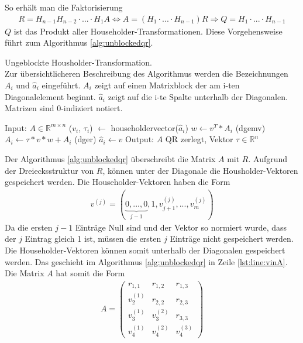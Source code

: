 So erhält man die Faktorisierung
\begin{align*}
R = H_{n-1} H_{n-2}\cdot ...\cdot H_1 A \Leftrightarrow A = (H_1\cdot ...\cdot H_{n-1})R \Rightarrow Q = H_1\cdot ... \cdot H_{n-1}
\end{align*}
$Q$ ist das Produkt aller Householder-Transformationen.
Diese Vorgehensweise führt zum Algorithmus \ref{alg:unblockedqr}. 
\begin{algorithm}[H]
	\caption{Ungeblockte Housholder-Transformation. \\
		Zur übersichtlicheren Beschreibung des Algorithmus werden die Bezeichnungen $A_i$ und $\hat{a}_i$ eingeführt.	$A_i$ zeigt auf einen Matrixblock der am i-ten Diagonalelement beginnt. $\hat{a}_i$ zeigt auf die i-te Spalte unterhalb der Diagonalen. Matrizen sind 0-indiziert notiert.}
	\begin{algorithmic}[1]
	\State Input: $A \in \mathbb{R}^{m \times n}$
		\State ($v_i$, $\tau_i$) $\leftarrow$ householdervector($\hat{a}_i$)
		\State $w \leftarrow v^T*A_i$ (dgemv)
		\State $ A_i \leftarrow \tau * v * w + A_i $ (dger)
			\State $\hat{a}_i \leftarrow v$ \label{lst:line:vinA}
		\EndIf
	\EndFor	
	\State Output: $A$ QR zerlegt, Vektor $\tau \in \mathbb{R}^n$
\end{algorithmic} 
\label{alg:unblockedqr}
\end{algorithm}

Der Algorithmus \ref{alg:unblockedqr} überschreibt die Matrix $A$ mit $R$.
Aufgrund der Dreiecksstruktur von $R$,
können unter der Diagonale die Housholder-Vektoren gespeichert werden. 
Die Householder-Vektoren haben die Form 
\begin{align*}
v^{(j)} = ( \underbrace{0,...,0}_{j-1},1,	v_{j+1}^{(j)},...,v_{m}^{(j)}  )
\end{align*}
Da die ersten $j-1$ Einträge Null sind und der Vektor so normiert wurde, dass der $j$ Eintrag gleich 1 ist, müssen die ersten $j$ Einträge nicht gespeichert werden.
Die Householder-Vektoren können somit unterhalb der Diagonalen gespeichert werden. Das geschieht im Algorithmus \ref{alg:unblockedqr} in Zeile \ref{lst:line:vinA}.
Die Matrix $A$ hat somit die Form
\begin{align*}
	A = 
	\left(\begin{array}{ccc}
	r_{1,1}   &  r_{1,2}  & r_{1,3} \\ 
	v_2^{(1)} &  r_{2,2}  & r_{2,3} \\ 
	v_3^{(1)} & v_3^{(2)} & r_{3,3} \\ 
	v_4^{(1)} & v_4^{(2)} & v_4^{(3)}
	\end{array} \right) 
\end{align*}

